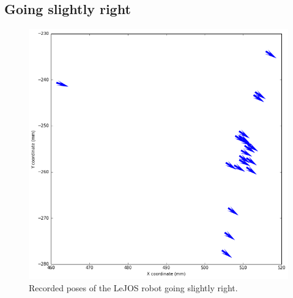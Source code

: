 \documentclass[paper=a4, fontsize=11pt]{scrartcl} %
\begin{document}
    \subsection{Going slightly right}
    \begin{figure}[h!]
        \begin{center}
            \setlength{\fboxsep}{0.5pt} %
            \setlength{\fboxrule}{0.5pt}
            \includegraphics[width=12cm,fbox]{images/poses_plot_3_slightRight.png}
            \caption{Recorded poses of the LeJOS robot going slightly right.}
        \end{center}
    \end{figure}
\end{document}
